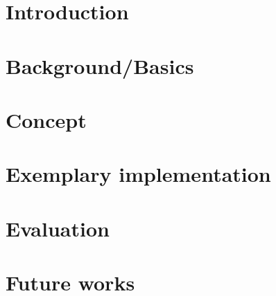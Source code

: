 \chapter{Introduction}




\chapter{Background/Basics}





\chapter{Concept}





\chapter{Exemplary implementation}


\chapter{Evaluation}

\chapter{Future works}
